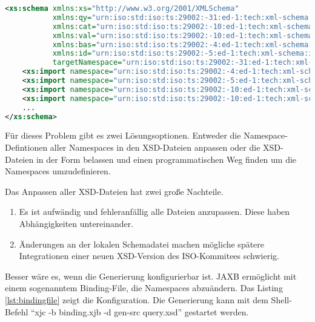 \begin{lstlisting}[caption=query.xsd Namespace Definitionen, language=XML, label=lst:queryschemanamespace]
<xs:schema xmlns:xs="http://www.w3.org/2001/XMLSchema"
           xmlns:qy="urn:iso:std:iso:ts:29002:-31:ed-1:tech:xml-schema:query"
           xmlns:cat="urn:iso:std:iso:ts:29002:-10:ed-1:tech:xml-schema:catalogue"
           xmlns:val="urn:iso:std:iso:ts:29002:-10:ed-1:tech:xml-schema:value"
           xmlns:bas="urn:iso:std:iso:ts:29002:-4:ed-1:tech:xml-schema:basic"
           xmlns:id="urn:iso:std:iso:ts:29002:-5:ed-1:tech:xml-schema:identifier"
           targetNamespace="urn:iso:std:iso:ts:29002:-31:ed-1:tech:xml-schema:query" elementFormDefault="qualified">
    <xs:import namespace="urn:iso:std:iso:ts:29002:-4:ed-1:tech:xml-schema:basic" schemaLocation="basic.xsd"/>
    <xs:import namespace="urn:iso:std:iso:ts:29002:-5:ed-1:tech:xml-schema:identifier" schemaLocation="identifier.xsd"/>
    <xs:import namespace="urn:iso:std:iso:ts:29002:-10:ed-1:tech:xml-schema:catalogue" schemaLocation="catalogue.xsd"/>
    <xs:import namespace="urn:iso:std:iso:ts:29002:-10:ed-1:tech:xml-schema:value" schemaLocation="value.xsd"/>
    ...
</xs:schema>    
\end{lstlisting}

Für dieses Problem gibt es zwei Lösungsoptionen. Entweder die Namespace-Defintionen aller Namespaces in den XSD-Dateien anpassen oder die XSD-Dateien in der Form belassen und einen programmatischen Weg finden um die Namespaces umzudefinieren. 

Das Anpassen aller XSD-Dateien hat zwei große Nachteile.
\begin{enumerate}
\item Es ist aufwändig und fehleranfällig alle Dateien anzupassen. Diese haben Abhängigkeiten untereinander.
\item Änderungen an der lokalen Schemadatei machen mögliche spätere Integrationen einer neuen XSD-Version des ISO-Kommitees schwierig.
\end{enumerate}

Besser wäre es, wenn die Generierung konfigurierbar ist. JAXB ermöglicht mit einem sogenanntem Binding-File, die Namespaces abzuändern. Das Listing \ref{lst:bindingfile} zeigt die Konfiguration. Die Generierung kann mit dem Shell-Befehl \enquote{xjc -b binding.xjb -d gen-src query.xsd} gestartet werden. 

